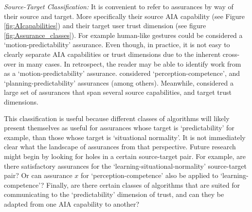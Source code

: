 \emph{Source-Target Classification:}
It is convenient to refer to assurances by way of their source and target. More specifically their source AIA capability (see Figure \ref{fig:AIcapabilities}) and their target user trust dimension (see figure \ref{fig:Assurance_classes}). For example human-like gestures could be considered a `motion-predictability' assurance. Even though, in practice, it is not easy to clearly separate AIA capabilities or trust dimensions due to the inherent cross-over in many cases. In retrospect, the reader may be able to identify work from \cite{Dragan2013-wd} as a `motion-predictability' assurance. \citet{Wang2016-id} considered `perception-competence', and `planning-predictability' assurances (among others). Meanwhile, \citet{Aitken2016-fb} considered a large set of assurances that span several source capabilities, and target trust dimensions. 

This classification is useful because different classes of algorithms will likely present themselves as useful for assurances whose target is `predictability' for example, than those whose target is `situational normality'. It is not immediately clear what the landscape of assurances from that perspective. Future research might begin by looking for holes in a certain source-target pair. For example, are there satisfactory assurances for the `learning-situational-normality' source-target pair? Or can assurance $x$ for `perception-competence' also be applied to `learning-competence'? Finally, are there certain classes of algorithms that are suited for communicating to the `predictability' dimension of trust, and can they be adapted from one AIA capability to another?
